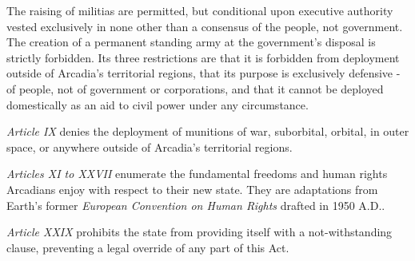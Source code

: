The raising of militias are permitted, but conditional upon executive authority vested exclusively in none other than a consensus of the people, not government. The creation of a permanent standing army at the government's disposal is strictly forbidden. Its three restrictions are that it is forbidden from deployment outside of Arcadia's territorial regions, that its purpose is exclusively defensive - of people, not of government or corporations, and that it cannot be deployed domestically as an aid to civil power under any circumstance.

\item {\it Article IX} denies the deployment of munitions of war, suborbital, orbital, in outer space, or anywhere outside of Arcadia's territorial regions.

\item {\it Articles XI to XXVII} enumerate the fundamental freedoms and human rights Arcadians enjoy with respect to their new state. They are adaptations from Earth's former {\it European Convention on Human Rights} drafted in 1950 A.D..

\item {\it Article XXIX} prohibits the state from providing itself with a not-withstanding clause, preventing a legal override of any part of this Act.
\stopitemize

